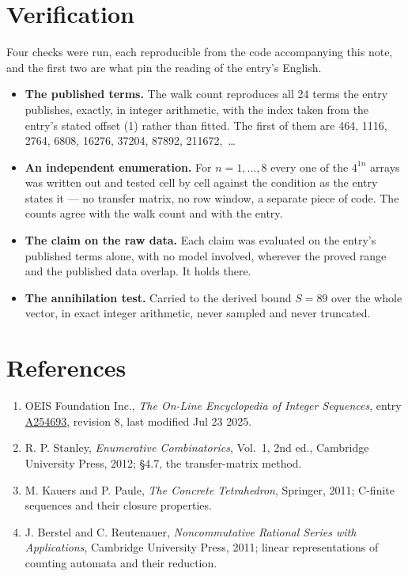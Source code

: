 \documentclass[11pt]{article}
\theoremstyle{definition}
\begin{document}
\section{Verification}

Four checks were run, each reproducible from the code accompanying this note, and the first two are what pin the reading of the entry's English.

\begin{itemize}

\item {\bfseries The published terms.} The walk count reproduces all 24 terms the entry publishes, exactly, in integer arithmetic, with the index taken from the entry's stated offset (1) rather than fitted. The first of them are 464, 1116, 2764, 6808, 16276, 37204, 87892, 211672,~\dots

\item {\bfseries An independent enumeration.} For $n = 1,\dots,8$ every one of the $4^{1n}$ arrays was written out and tested cell by cell against the condition as the entry states it --- no transfer matrix, no row window, a separate piece of code. The counts agree with the walk count and with the entry.

\item {\bfseries The claim on the raw data.} Each claim was evaluated on the entry's published terms alone, with no model involved, wherever the proved range and the published data overlap. It holds there.

\item {\bfseries The annihilation test.} Carried to the derived bound $S = 89$ over the whole vector, in exact integer arithmetic, never sampled and never truncated.

\end{itemize}

\section{References}

\begin{enumerate}

\item OEIS Foundation Inc., \emph{The On-Line Encyclopedia of Integer Sequences}, entry \href{https://oeis.org/A254693}{A254693}, revision 8, last modified Jul 23 2025.

\item R. P. Stanley, \emph{Enumerative Combinatorics}, Vol.~1, 2nd ed., Cambridge University Press, 2012; \S4.7, the transfer-matrix method.

\item M. Kauers and P. Paule, \emph{The Concrete Tetrahedron}, Springer, 2011; C-finite sequences and their closure properties.

\item J. Berstel and C. Reutenauer, \emph{Noncommutative Rational Series with Applications}, Cambridge University Press, 2011; linear representations of counting automata and their reduction.

\end{enumerate}
\end{document}
